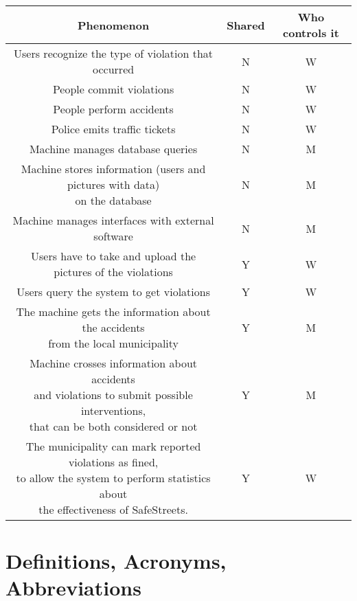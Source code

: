 \documentclass[../RASD.tex]{subfiles}
\begin{document}
    \newpage
    \begin{center}
        \begin{tabular}{ ||c|c|c|| }

            \hline
            \textbf{Phenomenon} & \textbf{Shared} & \textbf{Who controls it} \\ \hline
            Users recognize the type of violation that occurred & N & W \\ \hline
            People commit violations & N & W\\ \hline
            People perform accidents & N & W\\ \hline
            Police emits traffic tickets & N & W\\ \hline
            Machine manages database queries & N & M\\ \hline
            \makecell{Machine stores information (users and pictures with data)
            \\ on the database} & N & M\\ \hline
            Machine manages interfaces with external software & N & M\\ \hline
            Users have to take and upload the pictures of the violations & Y & W\\ \hline
            Users query the system to get violations & Y & W\\ \hline
            \makecell{The machine gets the information about the accidents
            \\from the local municipality} & Y & M\\ \hline
            \makecell{Machine crosses information about accidents
            \\and violations to submit possible interventions,
            \\that can be both considered or not} & Y & M\\ \hline
            \makecell{The municipality can mark reported violations as fined, \\ to allow the system
            to perform statistics about \\ the effectiveness of SafeStreets.} & Y & W\\

            \hline
        \end{tabular}
    \end{center}
    \newpage
    \section{Definitions, Acronyms, Abbreviations}\label{sec:definitions,-acronyms,-abbreviations}
\end{document}
